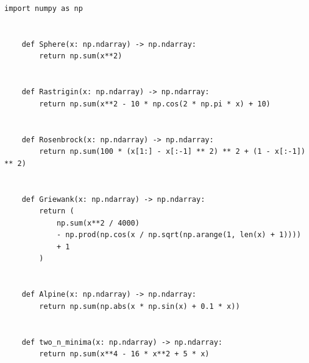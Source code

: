 \documentclass{jsarticle}
\begin{document}
\newpage
\begin{lstlisting}[caption=test functions.py]
    import numpy as np


    def Sphere(x: np.ndarray) -> np.ndarray:
        return np.sum(x**2)
    
    
    def Rastrigin(x: np.ndarray) -> np.ndarray:
        return np.sum(x**2 - 10 * np.cos(2 * np.pi * x) + 10)
    
    
    def Rosenbrock(x: np.ndarray) -> np.ndarray:
        return np.sum(100 * (x[1:] - x[:-1] ** 2) ** 2 + (1 - x[:-1]) ** 2)
    
    
    def Griewank(x: np.ndarray) -> np.ndarray:
        return (
            np.sum(x**2 / 4000)
            - np.prod(np.cos(x / np.sqrt(np.arange(1, len(x) + 1))))
            + 1
        )
    
    
    def Alpine(x: np.ndarray) -> np.ndarray:
        return np.sum(np.abs(x * np.sin(x) + 0.1 * x))
    
    
    def two_n_minima(x: np.ndarray) -> np.ndarray:
        return np.sum(x**4 - 16 * x**2 + 5 * x)
\end{lstlisting}
\newpage
\end{document}
